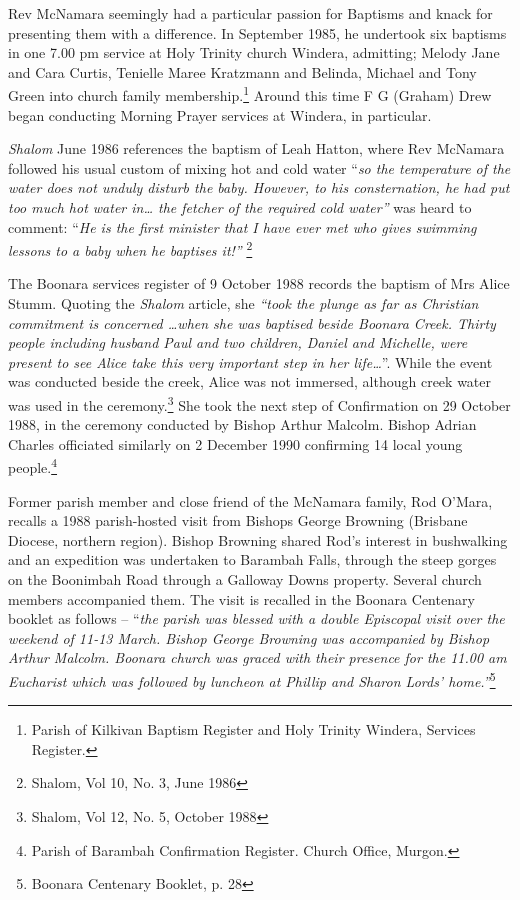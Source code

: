 Rev McNamara seemingly had a particular passion for Baptisms and knack for presenting them with a difference. In September 1985, he undertook six baptisms in one 7.00 pm service at Holy Trinity church Windera, admitting; Melody Jane and Cara Curtis, Tenielle Maree Kratzmann and Belinda, Michael and Tony Green into church family membership.\footnote{Parish of Kilkivan Baptism Register and Holy Trinity Windera, Services Register.} Around this time F G (Graham) Drew began conducting Morning Prayer services at Windera, in particular.


\emph{Shalom} June 1986 references the baptism of Leah Hatton, where Rev McNamara followed his usual custom of mixing hot and cold water ``\emph{so the temperature of the water does not unduly disturb the baby. However, to his consternation, he had put too much hot water in\ldots{} the fetcher of the required cold water''} was heard to comment: ``\emph{He is the first minister that I have ever met who gives swimming lessons to a baby when he baptises it!''} \footnote{Shalom, Vol 10, No. 3, June 1986}


The Boonara services register of 9 October 1988 records the baptism of Mrs Alice Stumm. Quoting the \emph{Shalom} article, she \emph{``took the plunge as far as Christian commitment is concerned \ldots when she was baptised beside Boonara Creek. Thirty people including husband Paul and two children, Daniel and Michelle, were present to see Alice take this very important step in her life\ldots{}}''. While the event was conducted beside the creek, Alice was not immersed, although creek water was used in the ceremony.\footnote{Shalom, Vol 12, No. 5, October 1988} She took the next step of Confirmation on 29 October 1988, in the ceremony conducted by Bishop Arthur Malcolm. Bishop Adrian Charles officiated similarly on 2 December 1990 confirming 14 local young people.\footnote{Parish of Barambah Confirmation Register. Church Office, Murgon.}


Former parish member and close friend of the McNamara family, Rod O'Mara, recalls a 1988 parish-hosted visit from Bishops George Browning (Brisbane Diocese, northern region). Bishop Browning shared Rod's interest in bushwalking and an expedition was undertaken to Barambah Falls, through the steep gorges on the Boonimbah Road through a Galloway Downs property. Several church members accompanied them. The visit is recalled in the Boonara Centenary booklet as follows -- ``\emph{the parish was blessed with a double Episcopal visit over the weekend of 11-13 March. Bishop George Browning was accompanied by Bishop Arthur Malcolm. Boonara church was graced with their presence for the 11.00 am Eucharist which was followed by luncheon at Phillip and Sharon Lords' home.''}\footnote{Boonara Centenary Booklet, p. 28}



